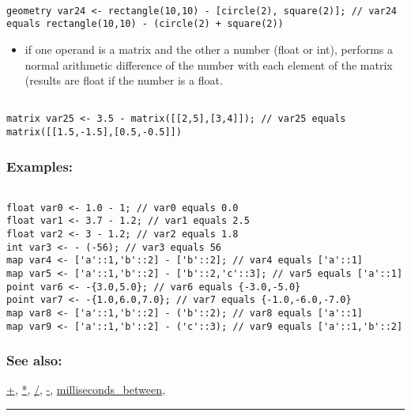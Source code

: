 \documentclass[]{book}
\providecommand{\tightlist}{%
  \setlength{\itemsep}{0pt}\setlength{\parskip}{0pt}}
\theoremstyle{definition}
\theoremstyle{definition}
\theoremstyle{definition}
\theoremstyle{remark}
\begin{document}
\begin{verbatim}
 
geometry var24 <- rectangle(10,10) - [circle(2), square(2)]; // var24 equals rectangle(10,10) - (circle(2) + square(2))
\end{verbatim}

\begin{itemize}
\tightlist
\item
  if one operand is a matrix and the other a number (float or int),
  performs a normal arithmetic difference of the number with each
  element of the matrix (results are float if the number is a float.
\end{itemize}

\begin{verbatim}
 
matrix var25 <- 3.5 - matrix([[2,5],[3,4]]); // var25 equals matrix([[1.5,-1.5],[0.5,-0.5]])
\end{verbatim}

\subsubsection{Examples:}\label{examples}

\begin{verbatim}
 
float var0 <- 1.0 - 1; // var0 equals 0.0 
float var1 <- 3.7 - 1.2; // var1 equals 2.5 
float var2 <- 3 - 1.2; // var2 equals 1.8 
int var3 <- - (-56); // var3 equals 56 
map var4 <- ['a'::1,'b'::2] - ['b'::2]; // var4 equals ['a'::1] 
map var5 <- ['a'::1,'b'::2] - ['b'::2,'c'::3]; // var5 equals ['a'::1] 
point var6 <- -{3.0,5.0}; // var6 equals {-3.0,-5.0} 
point var7 <- -{1.0,6.0,7.0}; // var7 equals {-1.0,-6.0,-7.0} 
map var8 <- ['a'::1,'b'::2] - ('b'::2); // var8 equals ['a'::1] 
map var9 <- ['a'::1,'b'::2] - ('c'::3); // var9 equals ['a'::1,'b'::2]
\end{verbatim}

\subsubsection{See also:}\label{see-also}

\href{operators-a-to-a.html\#+}{+}, \href{operators-a-to-a.html\#*}{*},
\href{operators-a-to-a.html\#/}{/}, \href{operators-a-to-a.html\#-}{-},
\href{operators-i-to-m.html\#milliseconds_between}{milliseconds\_between},

\begin{center}\rule{0.5\linewidth}{\linethickness}\end{center}
\end{document}
